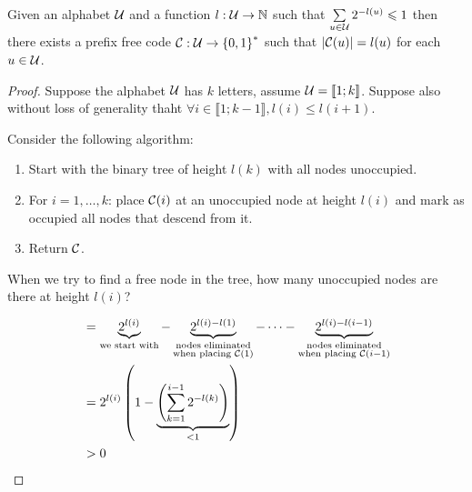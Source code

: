 \begin{theorem}
    Given an alphabet $\mathcal{U}$ and a function $l:\mathcal{U} \to \mathbb{N}$ such that $\sum\limits_{u\in\mathcal{U}} 2^{-l(u)} \leqslant 1$ then there exists a prefix free code $\mathcal{C} : \mathcal{U} \to \left\{ 0,1 \right\}^*$ such that $\left\lvert \mathcal{C}(u)\right\rvert = l(u)$ for each $u\in\mathcal{U}$.
\end{theorem}
\begin{proof}
    Suppose the alphabet $\mathcal{U}$ has $k$ letters, assume $\mathcal{U} = \llbracket 1;k \rrbracket$. Suppose also without loss of generality thaht $\forall i \in \llbracket 1; k-1 \rrbracket, l(i) \leqslant l(i+1)$.
    
    Consider the following algorithm:

    \begin{enumerate}
        \item Start with the binary tree of height $l(k)$ with all nodes unoccupied.
        \item For $i = 1,\ldots,k$: place $\mathcal{C}(i)$ at an unoccupied node at height $l(i)$ and mark as occupied all nodes that descend from it.
        \item Return $\mathcal{C}$.
    \end{enumerate}
    
    When we try to find a free node in the tree, how many unoccupied nodes are there at height $l(i)$?
    
    \[
        \begin{aligned}
            &= \underbrace{2^{l(i)}}_{\text{we start with}} - \underbrace{2^{l(i)-l(1)}}_{\substack{\text{nodes eliminated}\\ \text{when placing }\mathcal{C}(1)}} - \cdots - \underbrace{2^{l(i)-l(i-1)}}_{\substack{\text{nodes eliminated}\\ \text{when placing }\mathcal{C}(i-1)}}\\
            &= 2^{l(i)} \left( 1-\underbrace{\left(\sum\limits_{k=1}^{i-1} 2^{-l(k)} \right)}_{< 1} \right)\\
            &> 0
        \end{aligned}
    \]
\end{proof}

